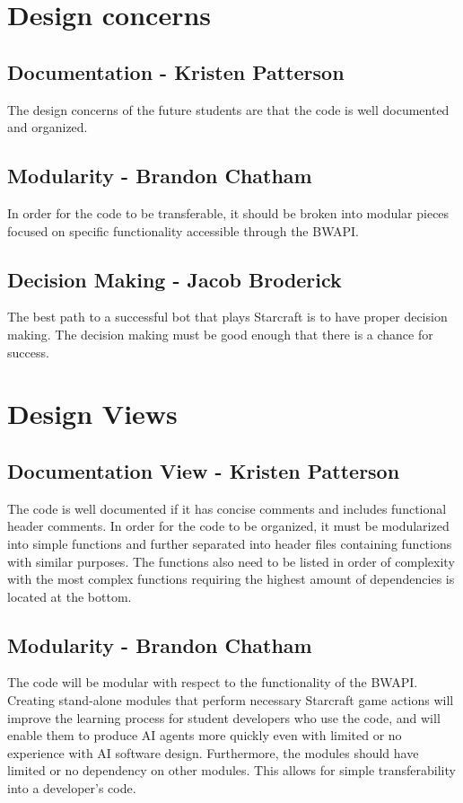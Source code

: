 \section{Design concerns}
\subsection{Documentation - Kristen Patterson}
	The design concerns of the future students are that the code is well documented and organized. 
\subsection{Modularity - Brandon Chatham}
	In order for the code to be transferable, it should be broken into modular pieces focused on specific functionality accessible through the BWAPI.
\subsection{Decision Making - Jacob Broderick}
	The best path to a successful bot that plays Starcraft is to have proper decision making. The decision making must be good enough that there is a chance for success.
	
\section{Design Views}
\subsection{Documentation View - Kristen Patterson}
	The code is well documented if it has concise comments and includes functional header comments. In order for the code to be organized, it must be modularized into simple functions and further separated into header files containing functions with similar purposes. The functions also need to be listed in order of complexity with the most complex functions requiring the highest amount of dependencies is located at the bottom.
\subsection{Modularity - Brandon Chatham}
	The code will be modular with respect to the functionality of the BWAPI. Creating stand-alone modules that perform necessary Starcraft game actions will improve the learning process for student developers who use the code, and will enable them to produce AI agents more quickly even with limited or no experience with AI software design. Furthermore, the modules should have limited or no dependency on other modules. This allows for simple transferability into a developer's code. 
